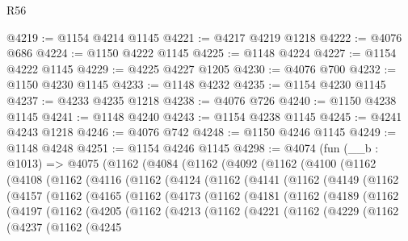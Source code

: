 \begin{lexlean}{R56}
\begin{coremodule}
@4219 := @1154 @4214 @1145
@4221 := @4217 @4219 @1218
@4222 := @4076 @686
@4224 := @1150 @4222 @1145
@4225 := @1148 @4224
@4227 := @1154 @4222 @1145
@4229 := @4225 @4227 @1205
@4230 := @4076 @700
@4232 := @1150 @4230 @1145
@4233 := @1148 @4232
@4235 := @1154 @4230 @1145
@4237 := @4233 @4235 @1218
@4238 := @4076 @726
@4240 := @1150 @4238 @1145
@4241 := @1148 @4240
@4243 := @1154 @4238 @1145
@4245 := @4241 @4243 @1218
@4246 := @4076 @742
@4248 := @1150 @4246 @1145
@4249 := @1148 @4248
@4251 := @1154 @4246 @1145
@4298 := @4074
    (fun (__b : @1013) =>
    @4075
      (@1162
        (@4084
          (@1162
            (@4092
              (@1162
                (@4100
                  (@1162
                    (@4108
                      (@1162
                        (@4116
                          (@1162
                            (@4124
                              (@1162
                                (@4141
                                  (@1162
                                    (@4149
                                      (@1162
                                        (@4157
                                          (@1162
                                            (@4165
                                              (@1162
                                                (@4173
                                                  (@1162
                                                    (@4181
                                                      (@1162
                                                        (@4189
                                                          (@1162
                                                            (@4197
                                                              (@1162
                                                                (@4205
                                                                  (@1162
                                                                    (@4213
                                                                      (@1162
                                                                        (@4221
                                                                          (@1162
                                                                            (@4229
                                                                              (@1162
                                                                                (@4237
                                                                                  (@1162
                                                                                    (@4245

\end{coremodule}
\end{lexlean}
